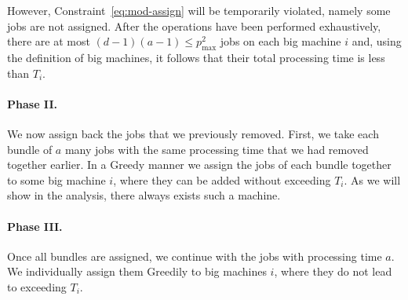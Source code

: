 \documentclass{article}
\begin{document}
However, Constraint~\eqref{eq:mod-assign} will be temporarily violated, namely some jobs are not assigned.
After the operations have been performed exhaustively, there are at most $(d-1)(a - 1) \le p_{\max}^2$ jobs on each
big machine $i$ and, using the definition of big machines, it follows that their total processing time is less than $T_i$.

\paragraph{Phase II.} We now assign back the jobs that we previously removed.
First, we take each bundle of $a$ many jobs with the same processing time that we had removed together earlier.
In a Greedy manner we assign the jobs of each bundle together to some big machine $i$, where they can be 
added without exceeding $T_i$. As we will show in the analysis, there always exists such a machine.

\paragraph{Phase III.} Once all bundles are assigned, we continue with the jobs with processing time $a$. We individually assign
them Greedily to big machines $i$, where they do not lead to exceeding $T_i$.
\end{document}
